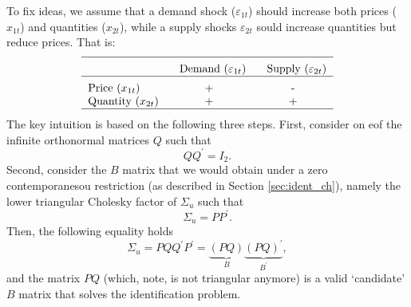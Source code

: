 \documentclass[10pt]{article}
\begin{document}
To fix ideas, we assume that a demand shock ($\varepsilon _{1t}$) should
increase both prices ($x_{1t}$) and quantities ($x_{2t}$), while a supply
shocks $\varepsilon _{2t}$ sould increase quantities but reduce prices. That
is:%
\begin{equation*}
\begin{tabular}{lcc}
\hline
\addlinespace & $\text{Demand}$ ($\varepsilon _{1t}$) & $\text{Supply}$ ($%
\varepsilon _{2t}$) \\ \hline
\addlinespace Price ($x_{1t}$) & + & - \\ 
Quantity ($x_{2t}$) & + & + \\ \hline
\end{tabular}%
\end{equation*}%
The key intuition is based on the following three steps. First, consider on
eof the infinite orthonormal matrices $Q$ such that 
\begin{equation*}
QQ^{\prime }=I_{2}.
\end{equation*}%
Second, consider the $B$ matrix that we would obtain under a zero
contemporanesou restriction (as described in Section \ref{sec:ident_ch}),
namely the lower triangular Cholesky factor of $\Sigma _{u}$ such that%
\begin{equation*}
\Sigma _{u}=PP^{\prime }.
\end{equation*}%
Then, the following equality holds%
\begin{equation*}
\Sigma _{u}=PQQ^{\prime }P^{\prime }=\underset{B}{\underbrace{\left(
PQ\right) }}\underset{B^{\prime }}{\underbrace{\left( PQ\right) ^{\prime }}},
\end{equation*}%
and the matrix $PQ$ (which, note, is not triangular anymore) is a valid
`candidate' $B$ matrix that solves the identification problem.
\end{document}
